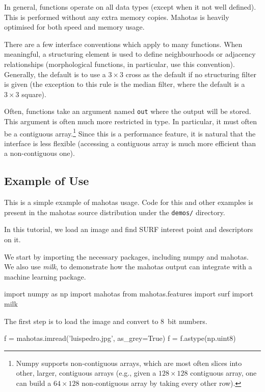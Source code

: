 \documentclass{article}
\let\code\texttt
\begin{document}
In general, functions operate on all data types (except when it not well
defined). This is performed without any extra memory copies. Mahotas is heavily
optimised for both speed and memory usage.

There are a few interface conventions which apply to many functions. When
meaningful, a structuring element is used to define neighbourhoods or adjacency
relationships (morphological functions, in particular, use this convention).
Generally, the default is to use a $3 \times 3$ cross as the
default if no structuring filter is given (the exception to this rule is the
median filter, where the default is a $3 \times 3$ square).

Often, functions take an argument named \code{out} where the output will be
stored. This argument is often much more restricted in type. In particular, it
must often be a contiguous array.\footnote{Numpy supports non-contiguous
arrays, which are most often slices into other, larger, contiguous arrays
(e.g., given a $128 \times 128$ contiguous array, one can build a $64 \times
128$ non-contiguous array by taking every other row).} Since this is a
performance feature, it is natural that the interface is less flexible
(accessing a contiguous array is much more efficient than a non-contiguous
one).

\subsection{Example of Use}

This is a simple example of mahotas usage. Code for this and other examples is
present in the mahotas source distribution under the \texttt{demos/} directory.

In this tutorial, we load an image and find SURF interest point and descriptors
on it.

We start by importing the necessary packages, including numpy and mahotas. We
also use \textit{milk}, to demonstrate how the mahotas output can integrate
with a machine learning package.

\begin{python}
import numpy as np
import mahotas
from mahotas.features import surf
import milk
\end{python}

The first step is to load the image and convert to 8~bit numbers.
\begin{python}
f = mahotas.imread('luispedro.jpg', as_grey=True)
f = f.astype(np.uint8)
\end{python}
\end{document}
